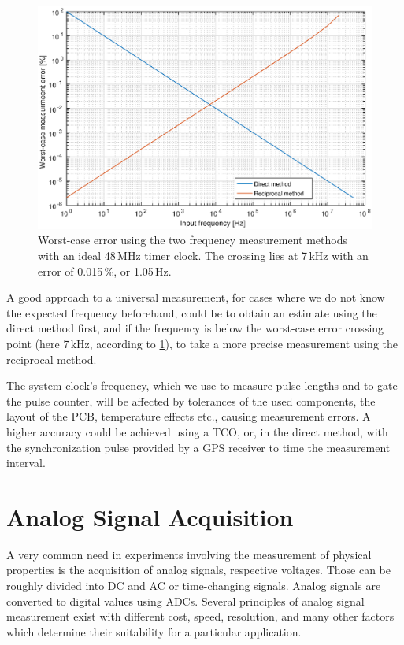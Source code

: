 \begin{figure}[h]
	\centering
	\includegraphics[width=\textwidth] {img/freqmethods.eps}
	\caption[Frequency measurement methods comparison]{\label{fig:freqmethods-graph}Worst-case error using the two frequency measurement methods with an ideal 48\,MHz timer clock. The crossing lies at 7\,kHz with an error of 0.015\,\%, or 1.05\,Hz.}
\end{figure}

A good approach to a universal measurement, for cases where we do not know the expected frequency beforehand, could be to obtain an estimate using the direct method first, and if the frequency is below the worst-case error crossing point (here 7\,kHz, according to \cref{fig:freqmethods-graph}), to take a more precise measurement using the reciprocal method.

The system clock's frequency, which we use to measure pulse lengths and to gate the pulse counter, will be affected by tolerances of the used components, the layout of the \gls{PCB}, temperature effects etc., causing measurement errors. A higher accuracy could be achieved using a \gls{TCO}, or, in the direct method, with the synchronization pulse provided by a \gls{GPS} receiver to time the measurement interval.

\section{Analog Signal Acquisition} \label{sec:theory-adc}

A very common need in experiments involving the measurement of physical properties is the acquisition of analog signals, respective voltages. Those can be roughly divided into \gls{DC} and \gls{AC} or time-changing signals. Analog signals are converted to digital values using \glspl{ADC}. Several principles of analog signal measurement exist with different cost, speed, resolution, and many other factors which determine their suitability for a particular application.


